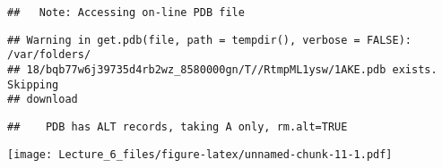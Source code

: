\documentclass[]{article}
\begin{document}
\begin{verbatim}
##   Note: Accessing on-line PDB file
\end{verbatim}

\begin{verbatim}
## Warning in get.pdb(file, path = tempdir(), verbose = FALSE): /var/folders/
## 18/bqb77w6j39735d4rb2wz_8580000gn/T//RtmpML1ysw/1AKE.pdb exists. Skipping
## download
\end{verbatim}

\begin{verbatim}
##    PDB has ALT records, taking A only, rm.alt=TRUE
\end{verbatim}

\texttt{[image: Lecture\_6\_files/figure-latex/unnamed-chunk-11-1.pdf]}
\end{document}
